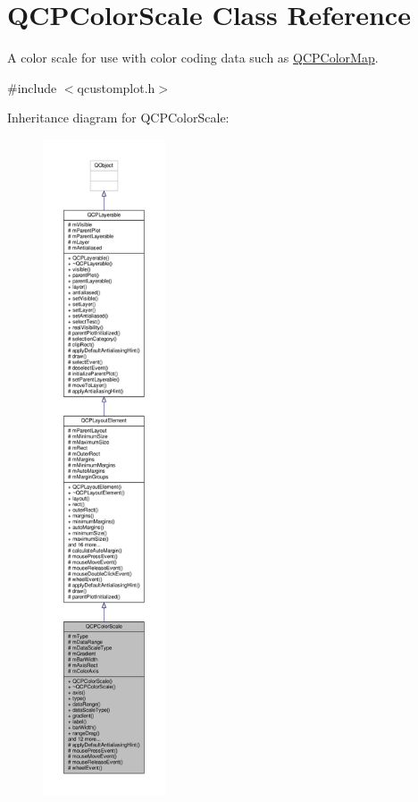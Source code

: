 \hypertarget{class_q_c_p_color_scale}{}\section{Q\+C\+P\+Color\+Scale Class Reference}
\label{class_q_c_p_color_scale}


A color scale for use with color coding data such as \hyperlink{class_q_c_p_color_map}{Q\+C\+P\+Color\+Map}.  




{\ttfamily \#include $<$qcustomplot.\+h$>$}



Inheritance diagram for Q\+C\+P\+Color\+Scale\+:\nopagebreak
\begin{figure}[H]
\begin{center}
\leavevmode
\includegraphics[height=550pt]{class_q_c_p_color_scale__inherit__graph}
\end{center}
\end{figure}


